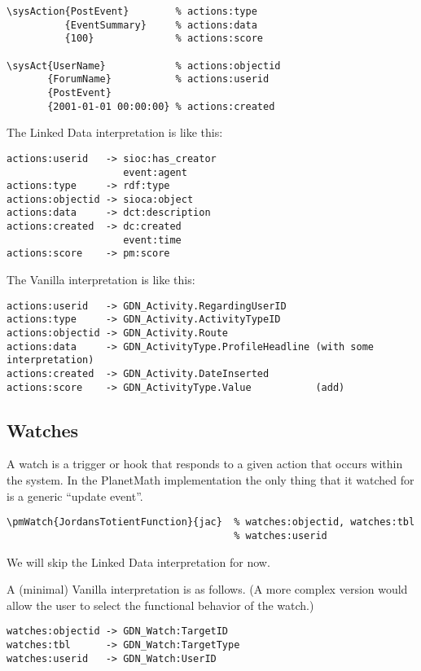 \documentclass{article}
\begin{document}
\begin{verbatim}
\sysAction{PostEvent}        % actions:type
          {EventSummary}     % actions:data
          {100}              % actions:score

\sysAct{UserName}            % actions:objectid
       {ForumName}           % actions:userid
       {PostEvent}
       {2001-01-01 00:00:00} % actions:created
\end{verbatim}

The Linked Data interpretation is like this:

\begin{verbatim}
actions:userid   -> sioc:has_creator
                    event:agent
actions:type     -> rdf:type
actions:objectid -> sioca:object
actions:data     -> dct:description
actions:created  -> dc:created
                    event:time
actions:score    -> pm:score
\end{verbatim}

The Vanilla interpretation is like this:

\begin{verbatim}
actions:userid   -> GDN_Activity.RegardingUserID
actions:type     -> GDN_Activity.ActivityTypeID
actions:objectid -> GDN_Activity.Route
actions:data     -> GDN_ActivityType.ProfileHeadline (with some interpretation)
actions:created  -> GDN_Activity.DateInserted
actions:score    -> GDN_ActivityType.Value           (add)
\end{verbatim}

\subsection{Watches} \label{watches}
A watch is a trigger or hook that responds to a given
action that occurs within the system.  In the PlanetMath
implementation the only thing that it watched for is a
generic ``update event''.

\begin{verbatim}
\pmWatch{JordansTotientFunction}{jac}  % watches:objectid, watches:tbl
                                       % watches:userid
\end{verbatim}

We will skip the Linked Data interpretation for now.

A (minimal) Vanilla interpretation is as follows.  (A more
complex version would allow the user to select the
functional behavior of the watch.)

\begin{verbatim}
watches:objectid -> GDN_Watch:TargetID
watches:tbl      -> GDN_Watch:TargetType
watches:userid   -> GDN_Watch:UserID
\end{verbatim}
\end{document}
